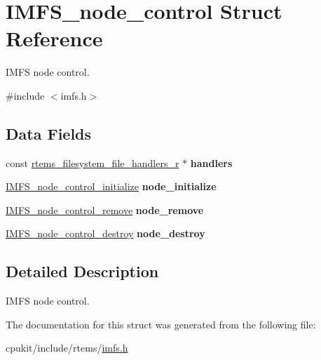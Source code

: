 \hypertarget{structIMFS__node__control}{}\section{I\+M\+F\+S\+\_\+node\+\_\+control Struct Reference}
\label{structIMFS__node__control}


I\+M\+FS node control.  




{\ttfamily \#include $<$imfs.\+h$>$}

\subsection*{Data Fields}
\begin{DoxyCompactItemize}
\item 
\mbox{\label{structIMFS__node__control_a1610c3bda443be02b04a9b2691de49bb}} 
const \mbox{\hyperlink{struct__rtems__filesystem__file__handlers__r}{rtems\+\_\+filesystem\+\_\+file\+\_\+handlers\+\_\+r}} $\ast$ {\bfseries handlers}
\item 
\mbox{\label{structIMFS__node__control_a1594525468fb22bca96fdd60b7da7022}} 
\mbox{\hyperlink{group__IMFSGenericNodes_gaa17eaae581fd5703b3bd1a3b5e95b054}{I\+M\+F\+S\+\_\+node\+\_\+control\+\_\+initialize}} {\bfseries node\+\_\+initialize}
\item 
\mbox{\label{structIMFS__node__control_aae3cd5fb6edef4ded1e79f62664db951}} 
\mbox{\hyperlink{group__IMFSGenericNodes_gab8e5f3c5eb8c39d46a5cc865cf90125c}{I\+M\+F\+S\+\_\+node\+\_\+control\+\_\+remove}} {\bfseries node\+\_\+remove}
\item 
\mbox{\label{structIMFS__node__control_a1ef066908e1df7ec08bb342afcc65674}} 
\mbox{\hyperlink{group__IMFSGenericNodes_ga9b01d3df01e1e6c71cd242336fe2a793}{I\+M\+F\+S\+\_\+node\+\_\+control\+\_\+destroy}} {\bfseries node\+\_\+destroy}
\end{DoxyCompactItemize}


\subsection{Detailed Description}
I\+M\+FS node control. 

The documentation for this struct was generated from the following file\+:\begin{DoxyCompactItemize}
\item 
cpukit/include/rtems/\mbox{\hyperlink{imfs_8h}{imfs.\+h}}\end{DoxyCompactItemize}
